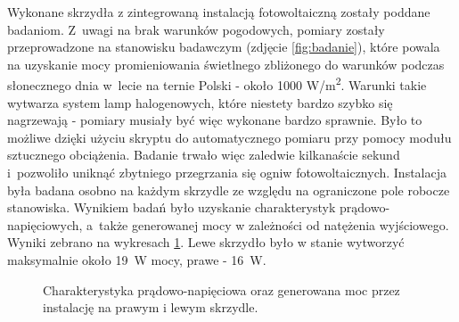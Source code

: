 \documentclass[12pt, a4paper]{article}
\begin{document}
Wykonane skrzydła z zintegrowaną instalacją fotowoltaiczną zostały poddane badaniom. Z~uwagi na brak warunków pogodowych, pomiary zostały przeprowadzone na stanowisku badawczym (zdjęcie \ref{fig:badanie}), które powala na uzyskanie mocy promieniowania świetlnego zbliżonego do warunków podczas słonecznego dnia w~lecie na ternie Polski - około 1000 W/m\textsuperscript{2}. Warunki takie wytwarza system lamp halogenowych, które niestety bardzo szybko się nagrzewają - pomiary musiały być więc wykonane bardzo sprawnie. Było to możliwe dzięki użyciu skryptu do automatycznego pomiaru przy pomocy modułu sztucznego obciążenia. Badanie trwało więc zaledwie kilkanaście sekund i~pozwoliło uniknąć zbytniego przegrzania się ogniw fotowoltaicznych. Instalacja była badana osobno na każdym skrzydle ze względu na ograniczone pole robocze stanowiska. Wynikiem badań było uzyskanie charakterystyk prądowo-napięciowych, a~także generowanej mocy w zależności od natężenia wyjściowego. Wyniki zebrano na wykresach \ref{fig:charakterystyki}. Lewe skrzydło było w stanie wytworzyć maksymalnie około 19~W mocy, prawe - 16~W.

\begin{figure}[ht]
    \centering
    \qquad
    \caption{Charakterystyka prądowo-napięciowa oraz generowana moc przez instalację na prawym i lewym skrzydle.}
    \label{fig:charakterystyki}
\end{figure}
\end{document}
